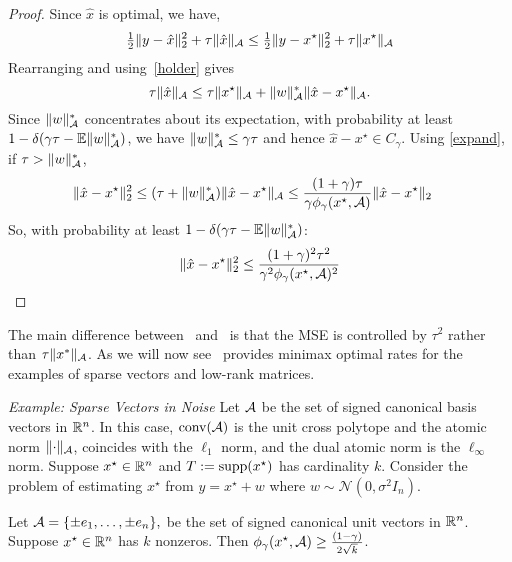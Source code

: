 \begin{proof}
Since $\hat{x}$ is optimal, we have,
\begin{equation*}
\tfrac{1}{2}\lVert y - \hat{x}\rVert_2^2 + \tau \lVert\hat{x}\rVert_{\mathcal{A}} \leq \tfrac{1}{2}\lVert y - x^\star\rVert_2^2 + \tau \lVert x^\star\rVert_{\mathcal{A}}
\end{equation*}
Rearranging and using~\eqref{holder} gives
\begin{equation*}
\tau\lVert\hat{x}\rVert_{\mathcal{A}} \leq \tau\lVert x^\star\rVert_{\mathcal{A}} + \lVert w\rVert_{\mathcal{A}}^* \lVert\hat{x} - x^\star\rVert_{\mathcal{A}}.
\end{equation*} 
Since $\lVert w\rVert_{\mathcal{A}}^*$ concentrates about its expectation, with
probability at least $1-\delta(\gamma\tau - \operatorname{\mathbb{E}}\lVert w\rVert_{\mathcal{A}}^*)$, we have $\lVert w\rVert_{\mathcal{A}}^* \leq \gamma \tau$ and hence $\hat{x} - x^\star \in
C_\gamma$.
Using \eqref{expand}, if $\tau > \lVert w\rVert_{\mathcal{A}}^*$, 
\begin{align*}
\lVert\hat{x}-x^\star\rVert_2^2 & \leq (\tau + \lVert w\rVert_{\mathcal{A}}^*)\lVert\hat{x}-x^\star\rVert_{\mathcal{A}} \leq \frac{(1+\gamma) \tau}{\gamma\phi_\gamma(x^\star,\mathcal{A})}\lVert\hat{x}-x^\star\rVert_2
\end{align*}
So, with probability at least $1-\delta(\gamma\tau - \operatorname{\mathbb{E}}\lVert w\rVert_{\mathcal{A}}^*)$:
\begin{equation*}\belowdisplayskip=-10pt
\vnorm{\hat{x}-x^\star}_2^2  \leq \frac{(1+\gamma)^2 \tau^2}{\gamma^2 \phi_\gamma(x^\star,\A)^2}
\end{equation*}
\end{proof}

The main difference between~ and~ is that the
MSE is controlled by $\tau^2$ rather than $\tau \| x^*\|_{\mathcal{A}}$.
As we will now see~ provides minimax optimal rates for the
examples of sparse vectors and low-rank matrices.

\emph{Example: Sparse Vectors in Noise}
Let $\mathcal{A}$ be the set of signed canonical basis
vectors in $\mathbb{R}^n$. In this case, $\operatorname{conv}(\mathcal{A})$ is the unit cross polytope and the
atomic norm $\lVert\cdot\rVert_{\mathcal{A}}$, coincides with the $\ell_1$ norm, and the dual
atomic norm is the $\ell_\infty$ norm. Suppose $x^\star \in \mathbb{R}^n$ and $T :=
\operatorname{supp}(x^\star)$ has cardinality $k$. Consider the problem of estimating
$x^\star$ from $y = x^\star + w$ where $w \sim \mathcal{N}(0,\sigma^2 I_n).$


\begin{prop}
Let $\mathcal{A} = \{\pm e_1, \ldots, \pm e_n\},$  be the set of signed canonical unit vectors in $\mathbb{R}^n$. Suppose $x^\star \in \mathbb{R}^n$ has $k$ nonzeros.  Then $\phi_\gamma(x^\star,\mathcal{A}) \geq \frac{(1-\gamma)}{2\sqrt{k}}$.
\end{prop}

